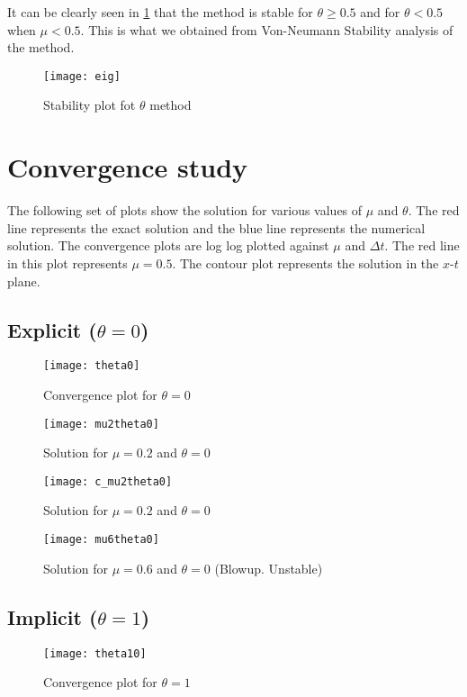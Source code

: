 \documentclass{article}
\begin{document}
It can be clearly seen in \figurename{\ref{eig}} that the method is stable for $\theta \geq 0.5$ and for $\theta < 0.5$ when $\mu < 0.5$. This is what we obtained from Von-Neumann Stability analysis of the method.


\begin{figure}[h!]
    \centering
    \texttt{[image: eig]}
    \caption{Stability plot fot $\theta$ method}
    \label{eig}
\end{figure}

\section{Convergence study}
The following set of plots show the solution for various values of $\mu$ and $\theta$. The red line represents the exact solution and the blue line represents the numerical solution. The convergence plots are log log plotted against $\mu$ and $\Delta t$. The red line in this plot represents $\mu=0.5$. The contour plot represents the solution in the $x$-$t$ plane.

\newpage
\subsection{Explicit ($\theta = 0$)}
\begin{figure}[h!]
    \centering
    \texttt{[image: theta0]}
    \caption{Convergence plot for $\theta=0$}
\end{figure}

\begin{figure}[h!]
    \centering
    \texttt{[image: mu2theta0]}
    \caption{Solution for $\mu=0.2$ and $\theta=0$}
\end{figure}
\begin{figure}[h!]
    \centering
    \texttt{[image: c\_mu2theta0]}
    \caption{Solution for $\mu=0.2$ and $\theta=0$}
\end{figure}
\begin{figure}[h!]
    \centering
    \texttt{[image: mu6theta0]}
    \caption{Solution for $\mu=0.6$ and $\theta=0$ (Blowup. Unstable)}
\end{figure}

\clearpage
\subsection{Implicit ($\theta = 1$)}
\begin{figure}[h!]
    \centering
    \texttt{[image: theta10]}
    \caption{Convergence plot for $\theta=1$}
\end{figure}
\end{document}
